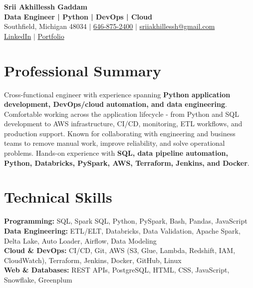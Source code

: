 \documentclass[letterpaper,10pt]{article}
\begin{document}
\fontsize{9.35pt}{10.45pt}\selectfont

\begin{center}
    {\LARGE \textbf{Srii Akhillessh Gaddam}} \\[-1pt]
    \textbf{Data Engineer | Python | DevOps | Cloud} \\[2pt]
    Southfield, Michigan 48034 $|$
    \href{tel:6468752400}{646-875-2400} $|$
    \href{mailto:sriiakhillessh@gmail.com}{sriiakhillessh@gmail.com} \\[1pt]
    \href{https://www.linkedin.com/in/srii-akhiilessh-gaddam-b48668191/}{LinkedIn} $|$
    \href{https://sriiakhillesshg.github.io/portfolio/}{Portfolio}
\end{center}
\vspace{-8pt}

\section{Professional Summary}
\small{Cross-functional engineer with experience spanning \textbf{Python application development, DevOps/cloud automation, and data engineering}. Comfortable working across the application lifecycle - from Python and SQL development to AWS infrastructure, CI/CD, monitoring, ETL workflows, and production support. Known for collaborating with engineering and business teams to remove manual work, improve reliability, and solve operational problems. Hands-on experience with \textbf{SQL, data pipeline automation, Python, Databricks, PySpark, AWS, Terraform, Jenkins, and Docker}.}

\section{Technical Skills}
\small{
\textbf{Programming:} SQL, Spark SQL, Python, PySpark, Bash, Pandas, JavaScript \\
\textbf{Data Engineering:} ETL/ELT, Databricks, Data Validation, Apache Spark, Delta Lake, Auto Loader, Airflow, Data Modeling \\
\textbf{Cloud \& DevOps:} CI/CD, Git, AWS (S3, Glue, Lambda, Redshift, IAM, CloudWatch), Terraform, Jenkins, Docker, GitHub, Linux \\
\textbf{Web \& Databases:} REST APIs, PostgreSQL, HTML, CSS, JavaScript, Snowflake, Greenplum
}

\end{document}

